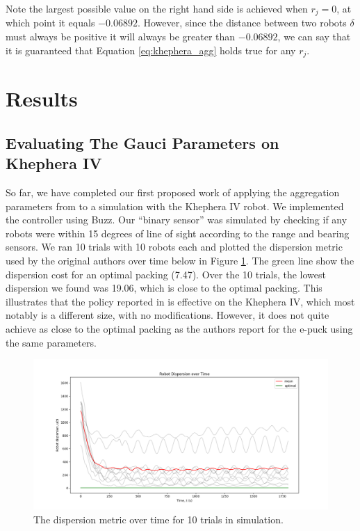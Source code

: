 \documentclass[conference]{IEEEtran}
\begin{document}
   Note the largest possible value on the right hand side is achieved when $r_j=0$, at which point it equals $-0.06892$. However, since the distance between two robots $\delta$ must always be positive it will always be greater than $-0.06892$, we can say that it is guaranteed that Equation \ref{eq:khephera_agg} holds true for any $r_j$.

\section{Results}

  \subsection{Evaluating The Gauci Parameters on Khephera IV}

  So far, we have completed our first proposed work of applying the aggregation parameters from \cite{gauci_self-organized_2014} to a simulation with the Khephera IV robot. We implemented the controller using Buzz. Our ``binary sensor'' was simulated by checking if any robots were within 15 degrees of line of sight according to the range and bearing sensors. We ran 10 trials with 10 robots each and plotted the dispersion metric used by the original authors over time below in Figure \ref{fig:dispersion_gauci}. The green line show the dispersion cost for an optimal packing (7.47). Over the 10 trials, the lowest dispersion we found was 19.06, which is close to the optimal packing. This illustrates that the policy reported in \cite{gauci_self-organized_2014} is effective on the Khephera IV, which most notably is a different size, with no modifications. However, it does not quite achieve as close to the optimal packing as the authors report for the e-puck using the same parameters.

  \begin{figure}
    \centering
    \includegraphics[width=1\linewidth]{./images/robot_dispersion_over_10_trials.png}
    \caption{The dispersion metric over time for 10 trials in simulation.}
    \label{fig:dispersion_gauci}
  \end{figure}
\end{document}
